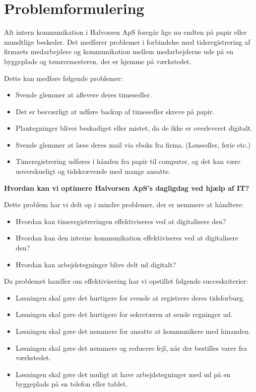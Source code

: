 \section{Problemformulering} \label{problemformulering}

Alt intern kommunikation i Halvorsen ApS foregår lige nu endten på papir eller mundtlige beskeder.
Det medfører problemer i forbindelse med tidsregistrering af firmaets medarbejdere og kommunikation mellem medarbejderne ude på en byggeplads og tømrermesteren, der er hjemme på værkstedet.

Dette kan medføre følgende problemer:
\begin{itemize}
    \item Svende glemmer at aflevere deres timesedler.
    \item Det er besværligt at udføre backup af timesedler skreve på papir.
    \item Plantegninger bliver beskadiget eller mistet, da de ikke er overleveret digitalt.
    \item Svende glemmer at læse deres mail via eboks fra firma. (Lønsedler, ferie etc.)
    \item Timeregistrering udføres i hånden fra papir til computer, og det kan være uoverskueligt og tidskrævende med mange ansatte.
\end{itemize}

\textbf{Hvordan kan vi optimere Halvorsen ApS's dagligdag ved hjælp af IT?}

Dette problem har vi delt op i mindre problemer, der er nemmere at håndtere:
\begin{itemize}
    \item Hvordan kan timeregistreringen effektiviseres ved at digitalisere den?
    \item Hvordan kan den interne kommunikation effektiviseres ved at digitalisere den?
    \item Hvordan kan arbejdstegninger blive delt ud digitalt?
\end{itemize}

Da problemet handler om effektivisering har vi opstillet følgende succeskriterier:

\begin{itemize}
    \item Løsningen skal gøre det hurtigere for svende at registrere deres tidsforburg.
    \item Løsningen skal gøre det hurtigere for sekretæren at sende regninger ud.
    \item Løsningen skal gøre det nemmere for ansatte at kommunikere med hinanden.
    \item Løsningen skal gøre det nemmere og reducere fejl, når der bestilles varer fra værkstedet.
    \item Løsningen skal gøre det muligt at have arbejdstegninger med ud på en byggeplads på en telefon eller tablet.
\end{itemize}